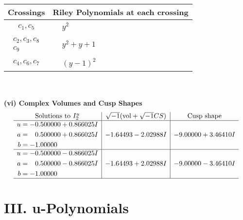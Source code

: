 \documentclass[1p]{elsarticle_modified}
\theoremstyle{definition}
\newcommand{\I}{\sqrt{-1}}
\begin{document}
\begin{tabular}{m{50pt}|m{274pt}}
Crossings & \hspace{64pt}Riley Polynomials at each crossing \\
\hline $$\begin{aligned}c_{1},c_{5}\end{aligned}$$&$\begin{aligned}
&y^2
\end{aligned}$\\
\hline $$\begin{aligned}c_{2},c_{3},c_{8}\\c_{9}\end{aligned}$$&$\begin{aligned}
&y^2+y+1
\end{aligned}$\\
\hline $$\begin{aligned}c_{4},c_{6},c_{7}\end{aligned}$$&$\begin{aligned}
&(y-1)^2
\end{aligned}$\\
\hline
\end{tabular}\\~\\
\newpage\flushleft \textbf{(vi) Complex Volumes and Cusp Shapes}
$$\begin{array}{c|c|c}  
\text{Solutions to }I^u_{2}& \I (\text{vol} + \sqrt{-1}CS) & \text{Cusp shape}\\
 \hline 
\begin{aligned}
u &= -0.500000 + 0.866025 I \\
a &= \phantom{-}0.500000 + 0.866025 I \\
b &= -1.00000\phantom{ +0.000000I}\end{aligned}
 & -1.64493 - 2.02988 I & -9.00000 + 3.46410 I \\ \hline\begin{aligned}
u &= -0.500000 - 0.866025 I \\
a &= \phantom{-}0.500000 - 0.866025 I \\
b &= -1.00000\phantom{ +0.000000I}\end{aligned}
 & -1.64493 + 2.02988 I & -9.00000 - 3.46410 I\\
 \hline 
 \end{array}$$\newpage
\newpage\renewcommand{\arraystretch}{1}
\centering \section*{ III. u-Polynomials}
\end{document}
